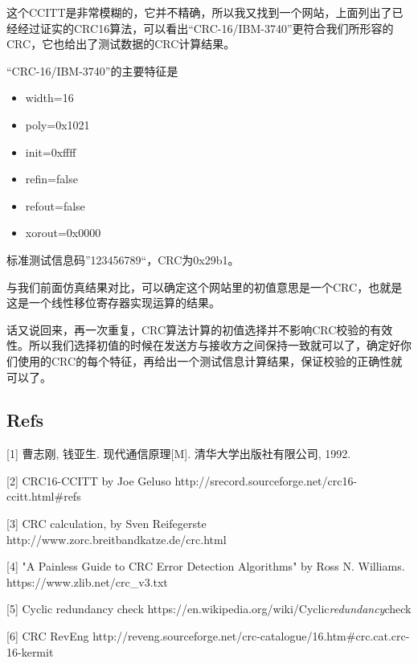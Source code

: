 \documentclass[
]{article}
\begin{document}
这个CCITT是非常模糊的，它并不精确，所以我又找到一个网站，上面列出了已经经过证实的CRC16算法，可以看出``CRC-16/IBM-3740''更符合我们所形容的CRC，它也给出了测试数据的CRC计算结果。

``CRC-16/IBM-3740''的主要特征是

\begin{itemize}
\item
  width=16
\item
  poly=0x1021
\item
  init=0xffff
\item
  refin=false
\item
  refout=false
\item
  xorout=0x0000
\end{itemize}

标准测试信息码''123456789``，CRC为0x29b1。

与我们前面仿真结果对比，可以确定这个网站里的初值意思是一个CRC，也就是这是一个线性移位寄存器实现运算的结果。

话又说回来，再一次重复，CRC算法计算的初值选择并不影响CRC校验的有效性。所以我们选择初值的时候在发送方与接收方之间保持一致就可以了，确定好你们使用的CRC的每个特征，再给出一个测试信息计算结果，保证校验的正确性就可以了。

\hypertarget{header-n322}{%
\subsection{Refs}\label{header-n322}}

{[}1{]} 曹志刚, 钱亚生. 现代通信原理{[}M{]}. 清华大学出版社有限公司,
1992.

{[}2{]} CRC16-CCITT by Joe Geluso
http://srecord.sourceforge.net/crc16-ccitt.html\#refs

{[}3{]} CRC calculation, by Sven Reifegerste
http://www.zorc.breitbandkatze.de/crc.html

{[}4{]} "A Painless Guide to CRC Error Detection Algorithms" by Ross N.
Williams. https://www.zlib.net/crc\_v3.txt

{[}5{]} Cyclic redundancy check
https://en.wikipedia.org/wiki/Cyclic\emph{redundancy}check

{[}6{]} CRC RevEng
http://reveng.sourceforge.net/crc-catalogue/16.htm\#crc.cat.crc-16-kermit
\end{document}
